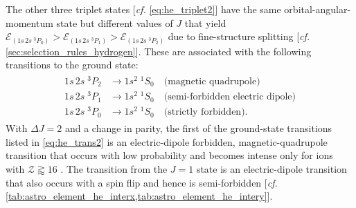 The other three triplet states [\emph{cf.\@} \cref{eq:he_triplet2}] have the same orbital-angular-momentum state but different values of $J$ that yield $\mathcal{E}_{(1s \, 2 s \; {}^3 \! P_{0})} > \mathcal{E}_{(1s \, 2 s \; {}^3 \! P_{1})} > \mathcal{E}_{(1s \, 2 s \; {}^3 \! P_{2})}$ due to fine-structure splitting [\emph{cf.\@} \cref{sec:selection_rules_hydrogen}]. 
These are associated with the following transitions to the ground state:
\begin{align}
 \begin{split}\label{eq:he_trans2}
 1s \, 2 s \; {}^3 \! P_{2} &\rightarrow 1 s^2 \; {}^1 \! S_{0} \quad \text{(magnetic quadrupole)} \\ 
 1s \, 2 s \; {}^3 \! P_{1} &\rightarrow 1 s^2 \; {}^1 \! S_{0} \quad \text{(semi-forbidden electric dipole)} \\ 
 1s \, 2 s \; {}^3 \! P_{0} &\rightarrow 1 s^2 \; {}^1 \! S_{0} \quad \text{(strictly forbidden)} .
 \end{split}
 \end{align}
With $\Delta J = 2$ and a change in parity, the first of the ground-state transitions listed in \cref{eq:he_trans2} is an electric-dipole forbidden, magnetic-quadrupole transition that occurs with low probability and becomes intense only for ions with $\mathcal{Z} \gtrapprox 16$ \cite{Porquet2010}. 
The transition from the $J=1$ state is an electric-dipole transition that also occurs with a spin flip and hence is semi-forbidden [\emph{cf.\@} \cref{tab:astro_element_he_interx,tab:astro_element_he_intery}]. %
